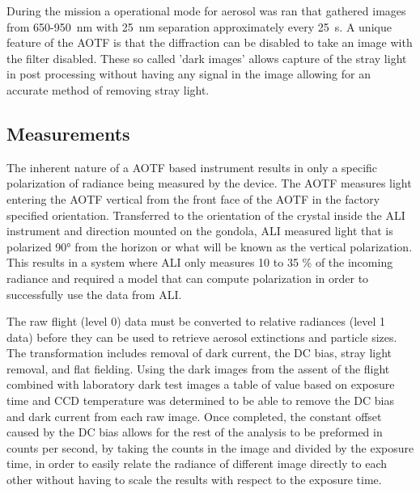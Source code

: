 \documentclass[12pt]{article}
\begin{document}
During the mission a operational mode for aerosol was ran that gathered images from 650-950~nm with 25~nm separation approximately every 25~s. A unique feature of the AOTF is that the diffraction can be disabled to take an image with the filter disabled. These so called 'dark images' allows capture of the stray light in post processing without having any signal in the image allowing for an accurate method of removing stray light.

\subsection{Measurements}

The inherent nature of a AOTF based instrument results in only a specific polarization of radiance being measured by the device. The AOTF measures light entering the AOTF vertical from the front face of the AOTF in the factory specified orientation. Transferred to the orientation of the crystal inside the ALI instrument and direction mounted on the gondola, ALI measured light that is polarized 90\si{\degree} from the horizon or what will be known as the vertical polarization. This results in a system where ALI only measures 10 to 35 \% of the incoming radiance and required a model that can compute polarization in order to successfully use the data from ALI.

The raw flight (level 0) data must be converted to relative radiances (level 1 data) before they can be used to retrieve aerosol extinctions and particle sizes. The transformation includes removal of dark current, the DC bias, stray light removal, and flat fielding. Using the dark images from the assent of the flight combined with laboratory dark test images a table of value based on exposure time and CCD temperature was determined to be able to remove the DC bias and dark current from each raw image. Once completed, the constant offset caused by the DC bias allows for the rest of the analysis to be preformed in counts per second, by taking the counts in the image and divided by the exposure time, in order to easily relate the radiance of different image directly to each other without having to scale the results with respect to the exposure time.
\end{document}
